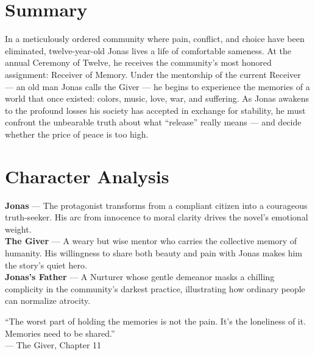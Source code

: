 \documentclass[11pt]{article}
\begin{document}
\vspace{8pt}

\section{Summary}

In a meticulously ordered community where pain, conflict, and choice have been eliminated, twelve-year-old Jonas lives a life of comfortable sameness. At the annual Ceremony of Twelve, he receives the community's most honored assignment: Receiver of Memory. Under the mentorship of the current Receiver --- an old man Jonas calls the Giver --- he begins to experience the memories of a world that once existed: colors, music, love, war, and suffering. As Jonas awakens to the profound losses his society has accepted in exchange for stability, he must confront the unbearable truth about what ``release'' really means --- and decide whether the price of peace is too high.

\vspace{6pt}

\section{Character Analysis}

{\color{accent}\bfseries Jonas} --- The protagonist transforms from a compliant citizen into a courageous truth-seeker. His arc from innocence to moral clarity drives the novel's emotional weight.\\[2pt]
{\color{accent}\bfseries The Giver} --- A weary but wise mentor who carries the collective memory of humanity. His willingness to share both beauty and pain with Jonas makes him the story's quiet hero.\\[2pt]
{\color{accent}\bfseries Jonas's Father} --- A Nurturer whose gentle demeanor masks a chilling complicity in the community's darkest practice, illustrating how ordinary people can normalize atrocity.

\vspace{6pt}

\begin{quotebox}
    ``The worst part of holding the memories is not the pain. It's the loneliness of it. Memories need to be shared.''\\[2pt]
    {\normalfont\color{accent}--- The Giver, Chapter 11}
\end{quotebox}
\end{document}
